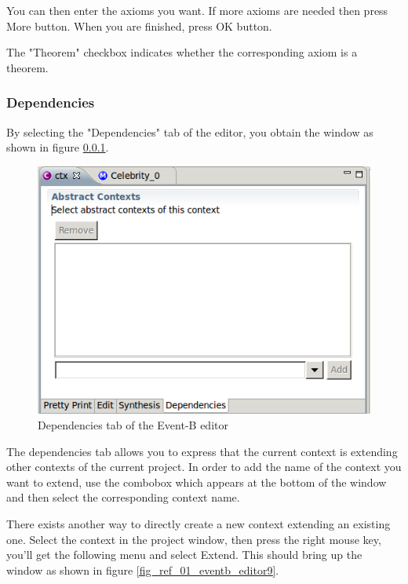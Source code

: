 You can then enter the axioms you want. If more axioms are needed then press \textsf{More} button. When you are finished, press \textsf{OK} button.

The "Theorem" checkbox indicates whether the corresponding axiom is a theorem.

\subsubsection{Dependencies}

By selecting the "Dependencies" tab of the editor, you obtain the window as shown in figure \ref{}.

\begin{figure}[!h]
\begin{center}
	\includegraphics{img/reference/ref_01_eventb_editor8.png}
	\caption{Dependencies tab of the Event-B editor}
	\label{fig_ref_01_eventb_editor8}
\end{center}
\end{figure}

The dependencies tab allows you to express that the current context is extending other contexts of the current project. In order to add the name of the context you want to extend, use the combobox which appears at the bottom of the window and then select the corresponding context name.

There exists another way to directly create a new context extending an existing one. Select the context in the project window, then press the right mouse key, you’ll get the following menu and select \textsf{Extend}. This should bring up the window as shown in figure \ref{fig_ref_01_eventb_editor9}.

